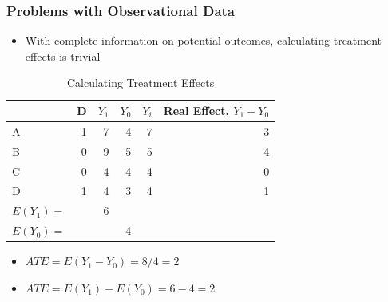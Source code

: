 \documentclass[xcolor=x11names,compress]{beamer}\usepackage[]{graphicx}\usepackage[]{color}
\renewcommand{\(}{\begin{columns}}
\renewcommand{\)}{\end{columns}}
\newcommand{\<}[1]{\begin{column}{#1}}
\renewcommand{\>}{\end{column}}
\begin{document}
\begin{frame}
\frametitle{Problems with Observational Data}
\begin{itemize}
\item With complete information on potential outcomes, calculating treatment effects is trivial
\end{itemize}
\begin{table}[htbp]
  \centering
  \caption{Calculating Treatment Effects}
    \begin{tabular}{|l|r|r|r|r|r|}
    \hline
          & \multicolumn{1}{l|}{D} & \multicolumn{1}{l|}{$Y_1$} & \multicolumn{1}{l|}{$Y_0$} & \multicolumn{1}{l|}{$Y_i$} & \multicolumn{1}{l|}{Real Effect, $Y_1 - Y_0$} \bigstrut\\
    \hline
    A     & 1     & 7     & 4     & 7     & 3 \bigstrut\\
    \hline
    B     & 0     & 9     & 5     & 5     & 4 \bigstrut\\
    \hline
    C     & 0     & 4     & 4     & 4     & 0 \bigstrut\\
    \hline
    D     & 1     & 4     & 3     & 4     & 1 \bigstrut\\
    \hline \pause
    $E(Y_1)=$ & & 6 & & \bigstrut\\
    \hline
    $E(Y_0)=$ & &  & 4& \bigstrut\\
    \hline
    \end{tabular}%
  \label{tab:addlabel}%
\end{table}%
\begin{itemize}
\item $ATE = E(Y_1-Y_0) = 8/4 = 2$
\item $ATE = E(Y_1) - E(Y_0) = 6 - 4 = 2$
\end{itemize}
\end{frame}
\end{document}
